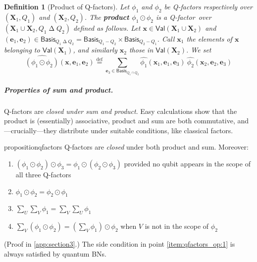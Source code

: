 \documentclass[10pt,a4paper]{article}
\newcommand*{\definitive}[1]{\textbf{#1}}
\newcommand*{\defeq}{\stackrel{\text{def}}{=}}
\newcommand*{\symdif}{\mathrel{\Delta}}
\newcommand*{\difset}{\mathrel{-}}
\newcommand*{\compfact}{\odot}
\newcommand*{\setofrv}[1]{\mathsf{Val}(#1)}
\newcommand{\ftone}{\mathbf{1}}
\newcommand{\bX}{\mathbf X}
\newcommand{\bx}{{\mathbf x}}
\newcommand{\be}{{\mathbf e}}
\newcommand*{\baseof}[1]{\textsf{Basis}_{#1}}
\newcommand{\qfactfunc}[1]{\widehat{#1}}
\newcommand{\reg}{Q}
\newcommand{\qreg}{\reg}
\newcommand*{\someqfact}{\phi}
\newcommand*{\qfactor}{Q-factor}
\newtheorem{definition}[theorem]{Definition}
\begin{document}
\begin{definition}[Product of \qfactor s]
\label{def:prod}
Let $\someqfact_1$ and $\someqfact_2$ be \qfactor s respectively over $(\bX_1,\qreg_1)$ and $(\bX_2,\qreg_2)$.
The \definitive{product $\someqfact_1 \compfact \someqfact_2$} is a \qfactor\ over $(\bX_1\cup\bX_2,\qreg_1\symdif\qreg_2)$ defined as follows.
Let $\bx\in\setofrv{\bX_1\cup\bX_2}$ and $(\be_1,\be_2)\in\baseof{\qreg_1\symdif\qreg_2}=\baseof{\qreg_1\difset\qreg_2}\times\baseof{\qreg_2\difset\qreg_1}$.
Call $\bx_1$ the elements of $\bx$ belonging to $\setofrv{\bX_1}$, and similarly $\bx_2$ those in $\setofrv{\bX_2}$.
We set
\begin{equation*}
\qfactfunc{(\someqfact_1 \compfact \someqfact_2)} (\bx,\be_1,\be_2)
\defeq
\sum_{\be_3 \in \baseof{\qreg_1\cap\qreg_2}} \qfactfunc{\someqfact_1}(\bx_1,\be_1,\be_3)\ \qfactfunc{\someqfact_2}(\bx_2,\be_2,\be_3)
\end{equation*}
\end{definition}


\subparagraph*{Properties of sum and product.}
\qfactor s are \emph{closed under sum and product}.
Easy calculations show that the product is (essentially) associative, product and sum are both commutative, and---crucially---they distribute under suitable conditions, like classical factors.

\begin{restatable}{proposition}{qfactors}
\label{lem:qfactors_op}
\qfactor s are \emph{closed} under both product and sum.
Moreover:
\begin{enumerate}
\item\label{item:qfactors_op:1}
$(\someqfact_1\compfact \someqfact_2) \compfact \someqfact_3 = \someqfact_1 \compfact (\someqfact_2\compfact \someqfact_3)$ provided no qubit appears in the scope of all three \qfactor s
\item
$\someqfact_1 \compfact \someqfact_2 = \someqfact_2 \compfact \someqfact_1$
\item
$\sum_U \sum_V \someqfact_1 = \sum_V \sum_U \someqfact_1$
\item
$\sum_V(\someqfact_1 \compfact \someqfact_2) = (\sum_V \someqfact_1) \compfact \someqfact_2$ when $V$ is not in the scope of $\someqfact_2$
\end{enumerate}
\end{restatable}
\noindent
(Proof in \cref{app:section3}.)
The side condition in point \ref{item:qfactors_op:1} is always satisfied by quantum BNs.
\end{document}
